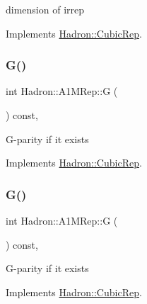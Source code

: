 dimension of irrep 

Implements \mbox{\hyperlink{structHadron_1_1CubicRep_ac178d14064f037a66af4b9fb4b312d51}{Hadron\+::\+Cubic\+Rep}}.

\mbox{\label{structHadron_1_1A1MRep_ab4115cbdcbc20fdc0641d1dc82da3f2f}} 
\subsubsection{\texorpdfstring{G()}{G()}\hspace{0.1cm}{\footnotesize\ttfamily [1/2]}}
{\footnotesize\ttfamily int Hadron\+::\+A1\+M\+Rep\+::G (\begin{DoxyParamCaption}{ }\end{DoxyParamCaption}) const\hspace{0.3cm}{\ttfamily [inline]}, {\ttfamily [virtual]}}

G-\/parity if it exists 

Implements \mbox{\hyperlink{structHadron_1_1CubicRep_a52104e43266d1614c00bbd1c3b395458}{Hadron\+::\+Cubic\+Rep}}.

\mbox{\label{structHadron_1_1A1MRep_ab4115cbdcbc20fdc0641d1dc82da3f2f}} 
\subsubsection{\texorpdfstring{G()}{G()}\hspace{0.1cm}{\footnotesize\ttfamily [2/2]}}
{\footnotesize\ttfamily int Hadron\+::\+A1\+M\+Rep\+::G (\begin{DoxyParamCaption}{ }\end{DoxyParamCaption}) const\hspace{0.3cm}{\ttfamily [inline]}, {\ttfamily [virtual]}}

G-\/parity if it exists 

Implements \mbox{\hyperlink{structHadron_1_1CubicRep_a52104e43266d1614c00bbd1c3b395458}{Hadron\+::\+Cubic\+Rep}}.

\mbox{\label{structHadron_1_1A1MRep_ad0776ade0fd54254ee8d0e3ba00b1f33}} 

